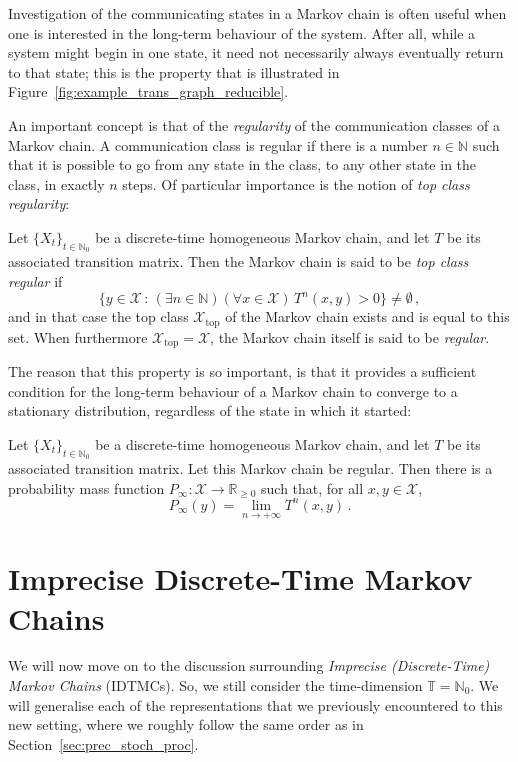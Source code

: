 \documentclass[graybox]{svmult}
\newcommand{\nats}{\mathbb{N}}
\newcommand{\natswith}{\nats_{0}}
\newcommand{\reals}{\mathbb{R}}
\newcommand{\realsnonneg}{\reals_{\geq 0}}
\newcommand{\states}{\mathcal{X}}
\newcommand{\timedim}{\mathbb{T}}
\begin{document}
Investigation of the communicating states in a Markov chain is often useful when one is interested in the long-term behaviour of the system. After all, while a system might begin in one state, it need not necessarily always eventually return to that state; this is the property that is illustrated in Figure~\ref{fig:example_trans_graph_reducible}.

An important concept is that of the \emph{regularity} of the communication classes of a Markov chain. A communication class is regular if there is a number $n\in\nats$ such that it is possible to go from any state in the class, to any other state in the class, in exactly $n$ steps. Of particular importance is the notion of \emph{top class regularity}:
\begin{definition}
Let $\{X_t\}_{t\in\natswith}$ be a discrete-time homogeneous Markov chain, and let $T$ be its associated transition matrix. Then the Markov chain is said to be \emph{top class regular} if
\begin{equation*}
\bigl\{ y\in\states\,:\,(\exists n\in\nats)(\forall x\in\states)\, T^n(x,y)>0 \bigr\} \neq \emptyset\,,
\end{equation*}
and in that case the top class $\states_\mathrm{top}$ of the Markov chain exists and is equal to this set. When furthermore $\states_\mathrm{top}=\states$, the Markov chain itself is said to be \emph{regular}.
\end{definition}
The reason that this property is so important, is that it provides a sufficient condition for the long-term behaviour of a Markov chain to converge to a stationary distribution, regardless of the state in which it started:
\begin{theorem}
Let $\{X_t\}_{t\in\natswith}$ be a discrete-time homogeneous Markov chain, and let $T$ be its associated transition matrix. Let this Markov chain be regular. Then there is a probability mass function $P_\infty:\states\to\realsnonneg$ such that, for all $x,y\in\states$, 
\begin{equation*}
P_\infty(y) = \lim_{n\to+\infty}T^n(x,y)\,.
\end{equation*}
\end{theorem}

\section{Imprecise Discrete-Time Markov Chains}\label{sec:idtmc}

We will now move on to the discussion surrounding \emph{Imprecise (Discrete-Time) Markov Chains} (IDTMCs). So, we still consider the time-dimension $\timedim=\natswith$. We will generalise each of the representations that we previously encountered to this new setting, where we roughly follow the same order as in Section~\ref{sec:prec_stoch_proc}. 
\end{document}
